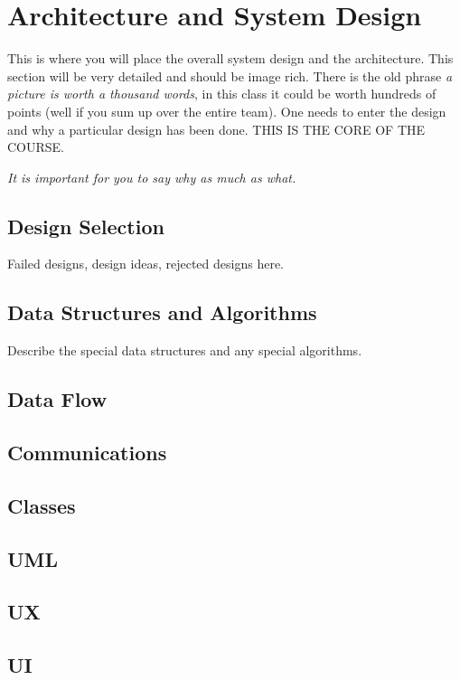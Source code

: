  \section{Architecture and System Design}
This is where you will place the overall system design and the architecture.   This section will be very detailed and should be image rich.  There is the old phrase {\it a picture is worth a thousand words}, in this class it could be worth hundreds of points (well if you sum up over the entire team).   One needs to enter the design and why a particular design has been done.   THIS IS THE CORE OF THE COURSE.    
 
 
 {\it It is important for you to say why as much as what.   }
 
   \subsection{Design Selection}
 Failed designs, design ideas, rejected designs here.
 
 \subsection{Data Structures and Algorithms}
 Describe the special data structures and any special algorithms.
 
 \subsection{Data Flow}
 
 \subsection{Communications}
 
 \subsection{Classes}
 
 \subsection{UML}
 
 \subsection{UX}
 
 \subsection{UI}
 

